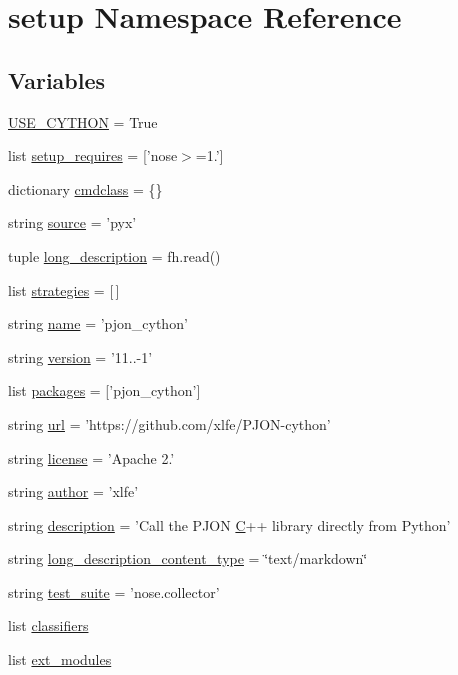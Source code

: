 \hypertarget{namespacesetup}{\section{setup Namespace Reference}
\label{namespacesetup}
}
\subsection*{Variables}
\begin{DoxyCompactItemize}
\item 
\hyperlink{namespacesetup_aa07dc63c1159effcf0fa37c51661f588}{U\-S\-E\-\_\-\-C\-Y\-T\-H\-O\-N} = True
\item 
list \hyperlink{namespacesetup_a2367b2951475f615fb78d9b5d9d07e50}{setup\-\_\-requires} = \mbox{[}'nose$>$=1.'\mbox{]}
\item 
dictionary \hyperlink{namespacesetup_aa128e9ba397a7b5b03bb964c4d14268d}{cmdclass} = \{\}
\item 
string \hyperlink{namespacesetup_a64ef73cb876c3cf5d8347c1b19706a94}{source} = 'pyx'
\item 
tuple \hyperlink{namespacesetup_a4cda9dbfb952875376a0749fe08a5bde}{long\-\_\-description} = fh.\-read()
\item 
list \hyperlink{namespacesetup_abddc983647e6cd39a723494905437b5f}{strategies} = \mbox{[}$\,$\mbox{]}
\item 
string \hyperlink{namespacesetup_a61de3710bf6c9d78c0afa352263f8b09}{name} = 'pjon\-\_\-cython'
\item 
string \hyperlink{namespacesetup_ab177531e7a80674a3db3de2d79eb8be7}{version} = '11..-\/1'
\item 
list \hyperlink{namespacesetup_aada4406eeab94f62c5f72fee617f0b82}{packages} = \mbox{[}'pjon\-\_\-cython'\mbox{]}
\item 
string \hyperlink{namespacesetup_a3376e8b9735800b5b9e455914cee908d}{url} = 'https\-://github.\-com/xlfe/P\-J\-O\-N-\/cython'
\item 
string \hyperlink{namespacesetup_aae5aa7c9d1cf462778a54e8f6a874c6f}{license} = 'Apache 2.'
\item 
string \hyperlink{namespacesetup_ac83393287a89728d636e4ae9f4ac914f}{author} = 'xlfe'
\item 
string \hyperlink{namespacesetup_ade8aa54df2083113a10326ea2fe7934b}{description} = 'Call the P\-J\-O\-N \hyperlink{Yun__Log__BatteryDisCharging_8ino_ad12b105c602c51bd04d7763f600688cc}{C}++ library directly from Python'
\item 
string \hyperlink{namespacesetup_ab8573970d095ad95021130f3f717825b}{long\-\_\-description\-\_\-content\-\_\-type} = \char`\"{}text/markdown\char`\"{}
\item 
string \hyperlink{namespacesetup_aaedcd7e0bf209e42aef838657a6bba4a}{test\-\_\-suite} = 'nose.\-collector'
\item 
list \hyperlink{namespacesetup_a2d96dddd66b7833bbb2db38dbbe55a02}{classifiers}
\item 
list \hyperlink{namespacesetup_a657516be9ed3c70ce05f5f6918206934}{ext\-\_\-modules}
\end{DoxyCompactItemize}


